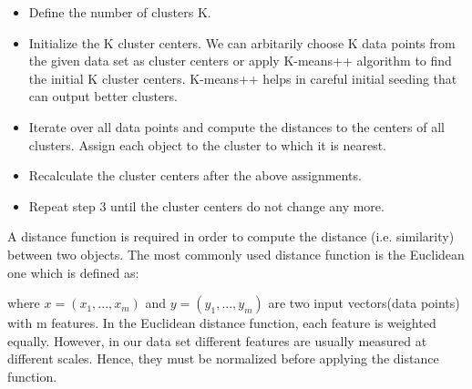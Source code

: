 \begin{itemize}
	\item Define the number of clusters K.
	
	\item Initialize the K cluster centers. We can arbitarily choose K data points from the given data set as cluster centers or apply K-means++ \cite{arthur2007k} algorithm to find the initial K cluster centers. K-means++ helps in careful initial seeding that can output better clusters.
	
	\item Iterate over all data points and compute the distances to the centers of all clusters. Assign each object to the cluster to which it is nearest.
	
	\item Recalculate the cluster centers after the above assignments.
	
	\item Repeat step 3 until the cluster centers do not change any more.
\end{itemize}

A distance function is required in order to compute the
distance (i.e. similarity) between two objects. The most commonly used distance function is the Euclidean one which is defined as:

\begin{center}
\end{center}
where $x = (x_1, ..., x_m)$ and $y = (y_1, ..., y_m)$ are two input vectors(data points) with m features. In the Euclidean distance function, each feature is weighted equally. However, in our data set different features are usually measured at different scales. Hence, they must be normalized before applying the distance function.